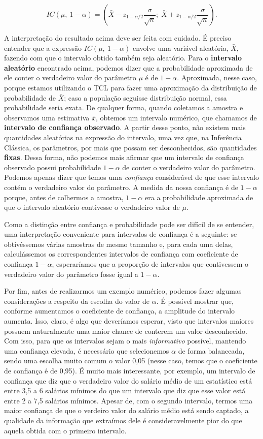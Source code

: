 \documentclass[
  letterpaper,
  DIV=11,
  numbers=noendperiod]{scrreprt}
\begin{document}
\[
IC(\mu,\ 1 - \alpha) = \left(\bar{X} - z_{1 - \alpha/2}\frac{\sigma}{\sqrt{n}};\; \bar{X} + z_{1 - \alpha/2}\frac{\sigma}{\sqrt{n}}\right).
\]

A interpretação do resultado acima deve ser feita com cuidado. É preciso
entender que a expressão \(IC(\mu,\ 1 - \alpha)\) envolve uma variável
aleatória, \(\bar{X}\), fazendo com que o intervalo obtido também seja
aleatório. Para o \textbf{intervalo aleatório} encontrado acima, podemos
dizer que a probabilidade aproximada de ele conter o verdadeiro valor do
parâmetro \(\mu\) é de \(1 - \alpha\). Aproximada, nesse caso, porque
estamos utilizando o TCL para fazer uma aproximação da distribuição de
probabilidade de \(\bar{X}\); caso a população seguisse distribuição
normal, essa probabilidade seria exata. De qualquer forma, quando
coletamos a amostra e observamos uma estimativa \(\bar{x}\), obtemos um
intervalo numérico, que chamamos de \textbf{intervalo de confiança
observado}. A partir desse ponto, não existem mais quantidades
aleatórias na expressão do intervalo, uma vez que, na Inferência
Clássica, os parâmetros, por mais que possam ser desconhecidos, são
quantidades \textbf{fixas}. Dessa forma, não podemos mais afirmar que um
intervalo de confiança observado possui probabilidade \(1 - \alpha\) de
conter o verdadeiro valor do parâmetro. Podemos apenas dizer que temos
uma \emph{confiança} considerável de que esse intervalo contém o
verdadeiro valor do parâmetro. A medida da nossa confiança é de
\(1 - \alpha\) porque, antes de colhermos a amostra, \(1 - \alpha\) era
a probabilidade aproximada de que o intervalo aleatório contivesse o
verdadeiro valor de \(\mu\).

Como a distinção entre confiança e probabilidade pode ser difícil de se
entender, uma interpretação conveniente para intervalos de confiança é a
seguinte: se obtivéssemos várias amostras de mesmo tamanho e, para cada
uma delas, calculássemos os correspondentes intervalos de confiança com
coeficiente de confiança \(1 - \alpha\), esperaríamos que a proporção de
intervalos que contivessem o verdadeiro valor do parâmetro fosse igual a
\(1 - \alpha\).

Por fim, antes de realizarmos um exemplo numérico, podemos fazer algumas
considerações a respeito da escolha do valor de \(\alpha\). É possível
mostrar que, conforme aumentamos o coeficiente de confiança, a amplitude
do intervalo aumenta. Isso, claro, é algo que deveríamos esperar, visto
que intervalos maiores possuem naturalmente uma maior chance de conterem
um valor desconhecido. Com isso, para que os intervalos sejam o mais
\emph{informativo} possível, mantendo uma confiança elevada, é
necessário que selecionemos \(\alpha\) de forma balanceada, sendo uma
escolha muito comum o valor 0,05 (nesse caso, temos que o coeficiente de
confiança é de 0,95). É muito mais interessante, por exemplo, um
intervalo de confiança que diz que o verdadeiro valor do salário médio
de um estatístico está entre 3,5 a 6 salários mínimos do que um
intervalo que diz que esse valor está entre 2 a 7,5 salários mínimos.
Apesar de, com o segundo intervalo, termos uma maior confiança de que o
verdeiro valor do salário médio está sendo captado, a qualidade da
informação que extraímos dele é consideravelmente pior do que aquela
obtida com o primeiro intervalo.
\end{document}
